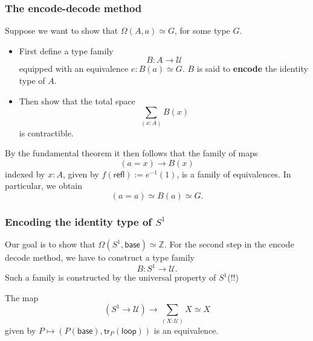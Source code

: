\documentclass[handout]{beamer}
\newcommand{\Z}{\mathbb{Z}}
\newcommand{\UU}{\mathcal{U}}
\newcommand{\sphere}[1]{S^{#1}}
\newcommand{\refl}{\mathsf{refl}}
\newcommand{\baseS}{\mathsf{base}}
\newcommand{\loopS}{\mathsf{loop}}
\newcommand{\tr}{\mathsf{tr}}
\begin{document}
\begin{frame}
  \frametitle{The encode-decode method}
  Suppose we want to show that $\Omega(A,a)\simeq G$, for some type $G$.
  \begin{itemize}
  \item First define a type family
    \begin{equation*}
      B : A \to \UU
    \end{equation*}
    equipped with an equivalence $e:B(a)\simeq G$. $B$ is said to \textbf{encode} the identity type of $A$.
  \item Then show that the total space
    \begin{equation*}
      \sum_{(x:A)}B(x)
    \end{equation*}
    is contractible.
  \end{itemize}
  By the fundamental theorem it then follows that the family of maps
  \begin{equation*}
    (a=x)\to B(x)
  \end{equation*}
  indexed by $x:A$, given by $f(\refl):=e^{-1}(1)$, is a family of equivalences. In particular, we obtain
  \begin{equation*}
    (a=a)\simeq B(a)\simeq G.
  \end{equation*}
\end{frame}

\begin{frame}
  \frametitle{Encoding the identity type of $\sphere{1}$}
  Our goal is to show that $\Omega(\sphere{1},\baseS)\simeq \Z$. For the second step in the encode decode method, we have to construct a type family
  \begin{equation*}
    B : \sphere{1}\to \UU.
  \end{equation*}
  Such a family is constructed by the universal property of $\sphere{1}$(!!)
  \begin{theorem}
    The map
    \begin{equation*}
      (\sphere{1}\to\UU)\to\sum_{(X:\UU)}X\simeq X
    \end{equation*}
    given by $P\mapsto (P(\baseS),\tr_P(\loopS))$ is an equivalence. 
  \end{theorem}
\end{frame}
\end{document}
